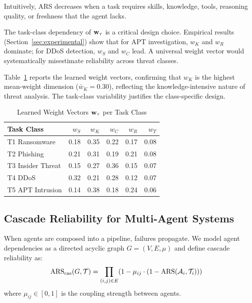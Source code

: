 Intuitively, ARS decreases when a task requires skills, knowledge, tools,
reasoning quality, or freshness that the agent lacks.

The task-class dependency of $\mathbf{w}_\tau$ is a critical design choice.
Empirical results (Section~\ref{sec:experimental}) show that for APT
investigation, $w_K$ and $w_R$ dominate; for DDoS detection, $w_S$ and
$w_C$ lead. A universal weight vector would systematically misestimate
reliability across threat classes.

Table~\ref{tab:weights_isaia} reports the learned weight vectors, confirming
that $w_K$ is the highest mean-weight dimension ($\bar{w}_K = 0.30$),
reflecting the knowledge-intensive nature of threat analysis. The
task-class variability justifies the class-specific design.

\begin{table}[t]
\caption{Learned Weight Vectors $\mathbf{w}_\tau$ per Task Class}
\label{tab:weights_isaia}
\centering
\footnotesize
\begin{tabular}{lrrrrr}
\toprule
\textbf{Task Class} & $w_S$ & $w_K$ & $w_C$ & $w_R$ & $w_T$ \\
\midrule
T1 Ransomware       & 0.18 & 0.35 & 0.22 & 0.17 & 0.08 \\
T2 Phishing         & 0.21 & 0.31 & 0.19 & 0.21 & 0.08 \\
T3 Insider Threat   & 0.15 & 0.27 & 0.36 & 0.15 & 0.07 \\
T4 DDoS             & 0.32 & 0.21 & 0.28 & 0.12 & 0.07 \\
T5 APT Intrusion    & 0.14 & 0.38 & 0.18 & 0.24 & 0.06 \\
\bottomrule
\end{tabular}
\end{table}

\subsection{Cascade Reliability for Multi-Agent Systems}

When agents are composed into a pipeline, failures propagate. We model
agent dependencies as a directed acyclic graph $G = (V, E, \mu)$ and
define cascade reliability as:
\begin{equation}
  \mathrm{ARS}_{\mathrm{cas}}(G, \mathcal{T}) = \prod_{(i,j) \in E}
    \!\left(1 - \mu_{ij} \cdot (1 - \mathrm{ARS}(\mathcal{A}_i, \mathcal{T}_i))\right)
  \label{eq:cascade}
\end{equation}
where $\mu_{ij} \in [0,1]$ is the coupling strength between agents.


